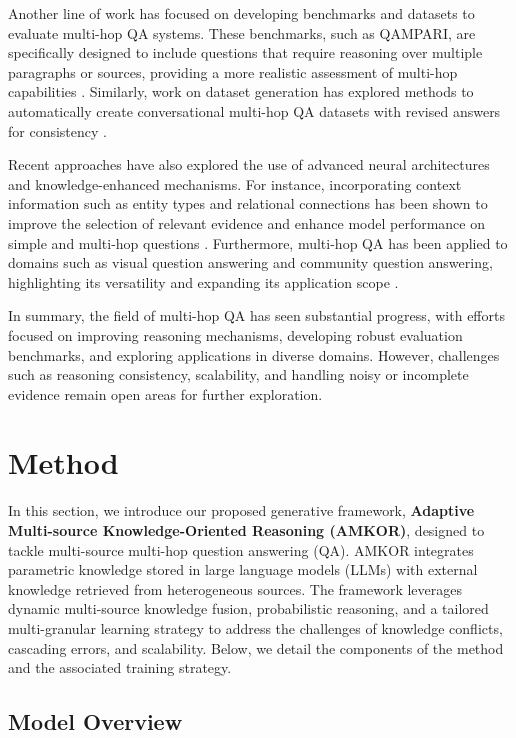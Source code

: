 Another line of work has focused on developing benchmarks and datasets to evaluate multi-hop QA systems. These benchmarks, such as QAMPARI, are specifically designed to include questions that require reasoning over multiple paragraphs or sources, providing a more realistic assessment of multi-hop capabilities \cite{amouyal2022qampari}. Similarly, work on dataset generation has explored methods to automatically create conversational multi-hop QA datasets with revised answers for consistency \cite{hwang2022conversational}.

Recent approaches have also explored the use of advanced neural architectures and knowledge-enhanced mechanisms. For instance, incorporating context information such as entity types and relational connections has been shown to improve the selection of relevant evidence and enhance model performance on simple and multi-hop questions \cite{chao2018context}. Furthermore, multi-hop QA has been applied to domains such as visual question answering and community question answering, highlighting its versatility and expanding its application scope \cite{hu2023qan,zhang2020product}.

In summary, the field of multi-hop QA has seen substantial progress, with efforts focused on improving reasoning mechanisms, developing robust evaluation benchmarks, and exploring applications in diverse domains. However, challenges such as reasoning consistency, scalability, and handling noisy or incomplete evidence remain open areas for further exploration.





\section{Method}

In this section, we introduce our proposed generative framework, \textbf{Adaptive Multi-source Knowledge-Oriented Reasoning (AMKOR)}, designed to tackle multi-source multi-hop question answering (QA). AMKOR integrates parametric knowledge stored in large language models (LLMs) with external knowledge retrieved from heterogeneous sources. The framework leverages dynamic multi-source knowledge fusion, probabilistic reasoning, and a tailored multi-granular learning strategy to address the challenges of knowledge conflicts, cascading errors, and scalability. Below, we detail the components of the method and the associated training strategy.

\subsection{Model Overview}

